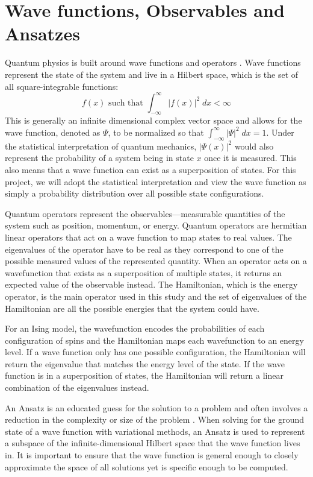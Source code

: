 \section{Wave functions, Observables and Ansatzes}\label{wavefunction}
Quantum physics is built around wave functions and operators \cite{GriffithsSchroeter2018}. Wave functions represent the state of the system and live in a Hilbert space, which is the set of all square-integrable functions:
\begin{equation*}
    f(x) \text{ such that } \int_{-\infty}^\infty |f(x)|^2 \; dx < \infty
\end{equation*}
This is generally an infinite dimensional complex vector space and allows for the wave function, denoted as $\Psi$, to be normalized so that $\int_{-\infty}^\infty |\Psi|^2 \; dx = 1$. Under the statistical interpretation of quantum mechanics, $|\Psi(x)|^2$ would also represent the probability of a system being in state $x$ once it is measured. This also means that a wave function can exist as a superposition of states. For this project, we will adopt the statistical interpretation and view the wave function as simply a probability distribution over all possible state configurations.

Quantum operators represent the observables---measurable quantities of the system such as position, momentum, or energy. Quantum operators are hermitian linear operators that act on a wave function to map states to real values. The eigenvalues of the operator have to be real as they correspond to one of the possible measured values of the represented quantity. When an operator acts on a wavefunction that exists as a superposition of multiple states, it returns an expected value of the observable instead. The Hamiltonian, which is the energy operator, is the main operator used in this study and the set of eigenvalues of the Hamiltonian are all the possible energies that the system could have. 

For an Ising model, the wavefunction encodes the probabilities of each configuration of spins and the Hamiltonian maps each wavefunction to an energy level. If a wave function only has one possible configuration, the Hamiltonian will return the eigenvalue that matches the energy level of the state. If the wave function is in a superposition of states, the Hamiltonian will return a linear combination of the eigenvalues instead.

An Ansatz is an educated guess for the solution to a problem and often involves a reduction in the complexity or size of the problem \cite{qaoareview}. When solving for the ground state of a wave function with variational methods, an Ansatz is used to represent a subspace of the infinite-dimensional Hilbert space that the wave function lives in. It is important to ensure that the wave function is general enough to closely approximate the space of all solutions yet is specific enough to be computed.